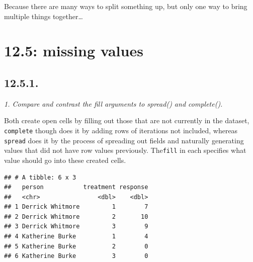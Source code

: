 \documentclass[]{book}
\newenvironment{Shaded}{\begin{snugshade}}{\end{snugshade}}
\newcommand{\DataTypeTok}[1]{\textcolor[rgb]{0.13,0.29,0.53}{#1}}
\newcommand{\DecValTok}[1]{\textcolor[rgb]{0.00,0.00,0.81}{#1}}
\newcommand{\KeywordTok}[1]{\textcolor[rgb]{0.13,0.29,0.53}{\textbf{#1}}}
\newcommand{\NormalTok}[1]{#1}
\newcommand{\OperatorTok}[1]{\textcolor[rgb]{0.81,0.36,0.00}{\textbf{#1}}}
\newcommand{\StringTok}[1]{\textcolor[rgb]{0.31,0.60,0.02}{#1}}
\theoremstyle{definition}
\theoremstyle{definition}
\theoremstyle{definition}
\theoremstyle{remark}
\begin{document}
Because there are many ways to split something up, but only one way to
bring multiple things together\ldots{}

\hypertarget{missing-values-1}{%
\section{12.5: missing values}\label{missing-values-1}}

\hypertarget{section-34}{%
\subsection{12.5.1.}\label{section-34}}

\emph{1. Compare and contrast the fill arguments to spread() and
complete().}

Both create open cells by filling out those that are not currently in
the dataset, \texttt{complete} though does it by adding rows of
iterations not included, whereas \texttt{spread} does it by the process
of spreading out fields and naturally generating values that did not
have row values previously. The\texttt{fill} in each specifies what
value should go into these created cells.

\begin{Shaded}
\end{Shaded}

\begin{verbatim}
## # A tibble: 6 x 3
##   person           treatment response
##   <chr>                <dbl>    <dbl>
## 1 Derrick Whitmore         1        7
## 2 Derrick Whitmore         2       10
## 3 Derrick Whitmore         3        9
## 4 Katherine Burke          1        4
## 5 Katherine Burke          2        0
## 6 Katherine Burke          3        0
\end{verbatim}
\end{document}
